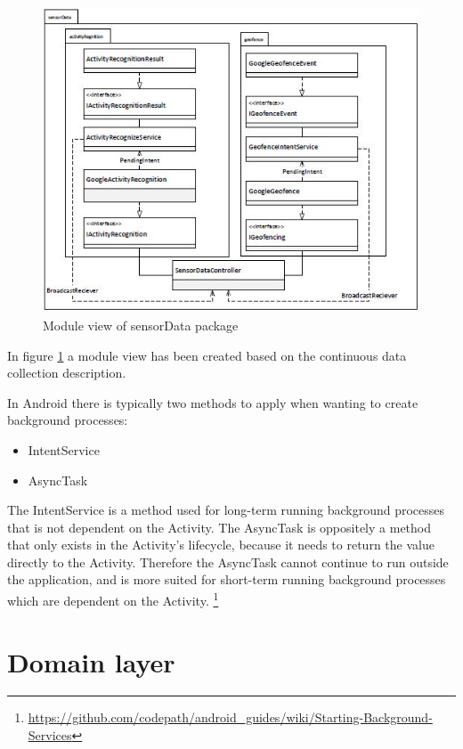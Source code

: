 \begin{figure}[H]
\centering
\includegraphics[scale=0.8]{Graphics/Images/Module_View_SensorData.jpg}
\caption{Module view of sensorData package}
\label{fig:Module_View_Sensor_Data}
\end{figure}
In figure \ref{fig:Module_View_Sensor_Data} a module view has been created based on the continuous data collection description. 

In Android there is typically two methods to apply when wanting to create background processes:
\begin{itemize}
    \item IntentService
    \item AsyncTask
\end{itemize}

The IntentService is a method used for long-term running background processes that is not dependent on the Activity. The AsyncTask is oppositely a method that only exists in the Activity's lifecycle, because it needs to return the value directly to the Activity. Therefore the AsyncTask cannot continue to run outside the application, and is more suited for short-term running background processes which are dependent on the Activity. 
\footnote{\url{https://github.com/codepath/android_guides/wiki/Starting-Background-Services}}

\section{Domain layer}

